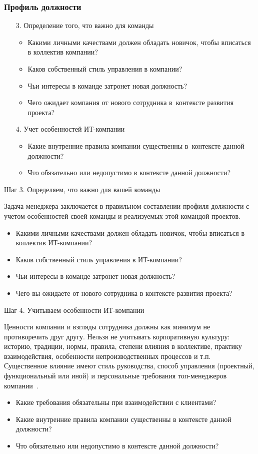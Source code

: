 \documentclass{../industrial-development}
\begin{document}
\begin{frame} \frametitle{Профиль должности}
  \begin{itemize}
		\item[3.] Определение того, что важно для команды
  \begin{itemize}
	\item Какими личными качествами должен обладать новичок, чтобы вписаться в коллектив компании?
	\item Каков собственный стиль управления в компании?
\item Чьи интересы в команде затронет новая должность?
\item	Чего ожидает компания от нового сотрудника в~контексте развития проекта?

	  \end{itemize}
		
		\item[4.] Учет особенностей ИТ-компании
		  \begin{itemize}
\item Какие внутренние правила компании существенны в~контексте данной должности?
\item Что обязательно или недопустимо в контексте данной должности?
 		  \end{itemize}
  \end{itemize}
\end{frame}

\lecturenotes

\alert{Шаг 3. Определяем, что важно для вашей команды}

Задача менеджера заключается в правильном составлении профиля должности с учетом особенностей своей команды и реализуемых этой командой проектов.
 \begin{itemize}
\item	Какими личными качествами должен обладать новичок, чтобы вписаться в коллектив ИТ-компании?
\item	Каков собственный стиль управления в ИТ-компании?
\item	Чьи интересы в команде затронет новая должность?
\item	Чего вы ожидаете от нового сотрудника в контексте развития проекта?
 \end{itemize}

\alert{Шаг 4. Учитываем особенности ИТ-компании}

Ценности компании и взгляды сотрудника должны как минимум не противоречить друг другу. Нельзя не учитывать корпоративную культуру: историю, традиции, нормы, правила, степени влияния в коллективе, практику взаимодействия, особенности непроизводственных процессов и т.п. Существенное влияние имеют стиль руководства, способ управления (проектный, функциональный или иной) и персональные требования топ-менеджеров компании~\cite[с.~280]{Pererva}.
 \begin{itemize}
\item	Какие требования обязательны при взаимодействии с клиентами?
\item	Какие внутренние правила компании существенны в контексте данной должности?
\item	Что обязательно или недопустимо в контексте данной должности?
 \end{itemize}
\end{document}
